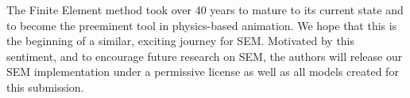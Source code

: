 The Finite Element method took over 40 years to mature to its current state and to become the preeminent tool in physics-based animation.
We hope that this is the beginning of a similar, exciting journey for SEM. 
Motivated by this sentiment, and to encourage future research on SEM, the authors will release our SEM implementation 
under a permissive license as well as all models created for this submission.
